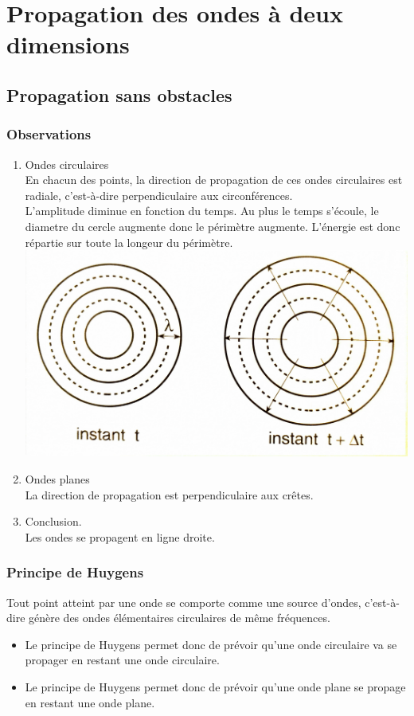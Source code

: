 \documentclass[11pt]{article}
\begin{document}
\section{Propagation des ondes à deux dimensions}
\subsection{Propagation sans obstacles}
\subsubsection{Observations}
\begin{enumerate}
    \item Ondes circulaires\\
    En chacun des points, la direction de propagation de ces ondes circulaires est radiale, c'est-à-dire perpendiculaire aux circonférences.\\
    L'amplitude diminue en fonction du temps. Au plus le temps s'écoule, le diametre du cercle augmente donc le périmètre augmente. L'énergie est donc répartie sur toute la longeur du périmètre.
    \includegraphics[scale = 0.1]{OndesCirculairesPropag.png}
    \item Ondes planes\\
    La direction de propagation est perpendiculaire aux crêtes.
    \item Conclusion.\\
    Les ondes se propagent en ligne droite.
\end{enumerate}
\subsubsection{Principe de Huygens}
Tout point atteint par une onde se comporte comme une source d'ondes, c'est-à-dire génère des ondes élémentaires circulaires de même fréquences.
\begin{itemize}
    \item Le principe de Huygens permet donc de prévoir qu'une onde circulaire va se propager en restant une onde circulaire.
    \item Le principe de Huygens permet donc de prévoir qu'une onde plane se propage en restant une onde plane.
\end{itemize}
\end{document}
